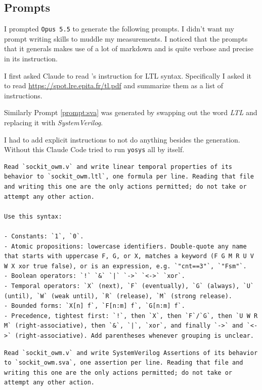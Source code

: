 \documentclass[letterpaper, 12pt]{article}
\begin{document}
\printbibliography
\begin{appendices}
	\section{Prompts}
	\label{appendix:prompts}

	I prompted \texttt{Opus 5.5} to generate the following prompts. I didn't want
	my prompt writing skills to muddle my measurements. I noticed that the prompts
	that it generals makes use of a lot of markdown and is quite verbose and
	precise in its instruction.

	I first asked Claude to read \cite{duret-lutz2022}'s instruction for LTL
	syntax. Specifically I asked it to read \url{https://spot.lre.epita.fr/tl.pdf}
	and summarize them as a list of instructions.

	Similarly Prompt \ref{prompt:sva} was generated by swapping out the word
	\textit{LTL} and replacing it with \textit{SystemVerilog}.

	I had to add explicit instructions to not do anything besides the generation.
	Without this Claude Code tried to run \texttt{yosys} all by
	itself.

	\begin{listing}[h]
		\caption{\texttt{ltl.md}}
		\label{prompt:ltl}
\begin{verbatim}
Read `sockit_owm.v` and write linear temporal properties of its behavior to `sockit_owm.ltl`, one formula per line. Reading that file and writing this one are the only actions permitted; do not take or attempt any other action.

Use this syntax:

- Constants: `1`, `0`.
- Atomic propositions: lowercase identifiers. Double-quote any name that starts with uppercase F, G, or X, matches a keyword (F G M R U V W X xor true false), or is an expression, e.g. `"cnt==3"`, `"Fsm"`.
- Boolean operators: `!` `&` `|` `->` `<->` `xor`.
- Temporal operators: `X` (next), `F` (eventually), `G` (always), `U` (until), `W` (weak until), `R` (release), `M` (strong release).
- Bounded forms: `X[n] f`, `F[n:m] f`, `G[n:m] f`.
- Precedence, tightest first: `!`, then `X`, then `F`/`G`, then `U W R M` (right-associative), then `&`, `|`, `xor`, and finally `->` and `<->` (right-associative). Add parentheses whenever grouping is unclear.
\end{verbatim}
	\end{listing}

	\begin{listing}[h]
		\caption{\texttt{sva.md}}
		\label{prompt:sva}
\begin{verbatim}
Read `sockit_owm.v` and write SystemVerilog Assertions of its behavior to `sockit_owm.sva`, one assertion per line. Reading that file and writing this one are the only actions permitted; do not take or attempt any other action.
\end{verbatim}
	\end{listing}

\end{appendices}
\end{document}
